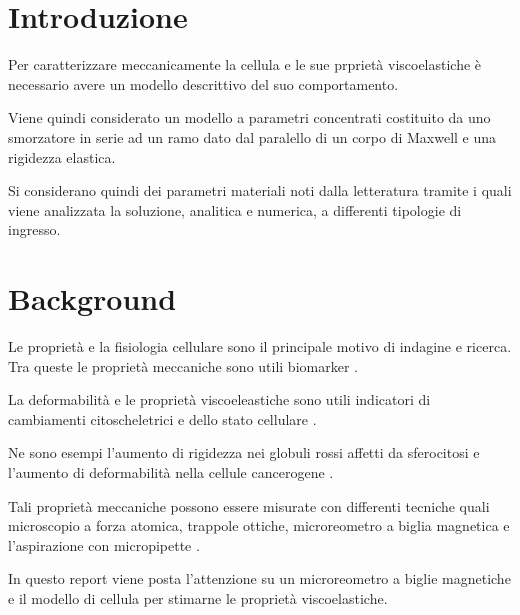 \section{Introduzione}

Per caratterizzare meccanicamente la cellula e le sue prprietà viscoelastiche è necessario avere un modello descrittivo del suo comportamento.

Viene quindi considerato un modello a parametri concentrati costituito da uno smorzatore in serie ad un ramo dato dal paralello di un corpo di Maxwell e una rigidezza elastica.

Si considerano quindi dei parametri materiali noti dalla letteratura tramite i quali viene analizzata la soluzione, analitica e numerica, a differenti tipologie di ingresso.


\section{Background}

Le proprietà e la fisiologia cellulare sono il principale motivo di indagine e ricerca. Tra queste le proprietà meccaniche sono utili biomarker \cite{di_carlo_mechanical_2012}. 

La deformabilità e le proprietà viscoeleastiche sono utili indicatori di cambiamenti citoscheletrici e dello stato cellulare .  

Ne sono esempi l'aumento di rigidezza nei globuli rossi affetti da sferocitosi \cite{lee_biomechanics_2007,suresh_connections_2005} e l'aumento di deformabilità nella cellule cancerogene \cite{mierke_viscoelasticity_2021}.

Tali proprietà meccaniche possono essere misurate con differenti tecniche quali microscopio a forza atomica, trappole ottiche, microreometro a biglia magnetica e l'aspirazione con micropipette \cite{ethier_introductory_nodate}.

In questo report viene posta l'attenzione su un microreometro a biglie magnetiche e il modello di cellula per stimarne le proprietà viscoelastiche.


